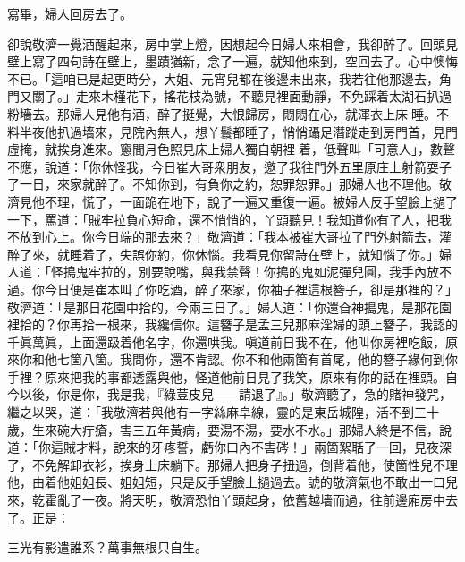寫畢，婦人回房去了。

卻說敬濟一覺酒醒起來，房中掌上燈，因想起今日婦人來相會，我卻醉了。回頭見壁上寫了四句詩在壁上，墨蹟猶新，念了一遍，就知他來到，空回去了。心中懊悔不已。「這咱已是起更時分，大姐、元宵兒都在後邊未出來，我若往他那邊去，角門又關了。」走來木槿花下，搖花枝為號，不聽見裡面動靜，不免踩着太湖石扒過粉墻去。那婦人見他有酒，醉了挺覺，大恨歸房，悶悶在心，就渾衣上床𢱉睡。不料半夜他扒過墻來，見院內無人，想丫鬟都睡了，悄悄躡足潛蹤走到房門首，見門虛掩，就挨身進來。窻間月色照見床上婦人獨自朝裡𢱉着，低聲叫「可意人」，數聲不應，說道：「你休怪我，今日崔大哥衆朋友，邀了我往門外五里原庄上射箭耍子了一日，來家就醉了。不知你到，有負你之約，恕罪恕罪。」那婦人也不理他。敬濟見他不理，慌了，一面跪在地下，說了一遍又重復一遍。{}被婦人反手望臉上撾了一下，罵道：「賊牢拉負心短命，還不悄悄的，丫頭聽見！我知道你有了人，把我不放到心上。你今日端的那去來？」敬濟道：「我本被崔大哥拉了門外射箭去，灌醉了來，就睡着了，失誤你約，你休惱。我看見你留詩在壁上，就知惱了你。」婦人道：「怪搗鬼牢拉的，別要說嘴，與我禁聲！你搗的鬼如泥彈兒圓，我手內放不過。你今日便是崔本叫了你吃酒，醉了來家，你袖子裡這根簪子，卻是那裡的？」敬濟道：「是那日花園中拾的，今兩三日了。」婦人道：「你還㒲神搗鬼，是那花園裡拾的？你再拾一根來，我纔信你。{}這簪子是孟三兒那麻淫婦的頭上簪子，{}我認的千眞萬眞，上面還趿着他名字，你還哄我。嗔道前日我不在，他叫你房裡吃飯，原來你和他七箇八箇。我問你，還不肯認。你不和他兩箇有首尾，他的簪子緣何到你手裡？原來把我的事都透露與他，怪道他前日見了我笑，{}原來有你的話在裡頭。自今以後，你是你，我是我，『綠荳皮兒——請退了』。」敬濟聽了，急的賭神發咒，繼之以哭，{}道：「我敬濟若與他有一字絲麻皁線，靈的是東岳城隍，活不到三十歲，生來碗大疔瘡，害三五年黃病，要湯不湯，要水不水。」{}那婦人終是不信，說道：「你這賊才料，說來的牙疼誓，虧你口內不害硶！」兩箇絮聒了一回，見夜深了，不免解卸衣衫，挨身上床躺下。那婦人把身子扭過，倒背着他，使箇性兒不理他，由着他姐姐長、姐姐短，只是反手望臉上撾過去。{}諕的敬濟氣也不敢出一口兒來，乾霍亂了一夜。將天明，敬濟恐怕丫頭起身，依舊越墻而過，往前邊廂房中去了。正是：

\begin{myquote}
三光有影遣誰系？萬事無根只自生。
\end{myquote}

